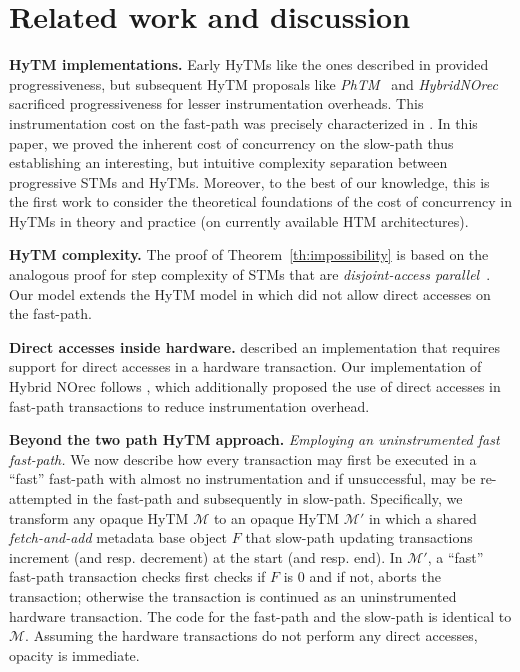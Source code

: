 \section{Related work and discussion}
\label{sec:rel}
%
\vspace{1mm}\noindent\textbf{HyTM implementations.}
Early HyTMs like the ones described in \cite{damronhytm, kumarhytm} provided progressiveness, but
subsequent HyTM proposals like \emph{PhTM}~\cite{phasedtm} and \emph{HybridNOrec}~\cite{hybridnorec} sacrificed progressiveness for lesser instrumentation overheads.
This instrumentation cost on the fast-path was precisely characterized in \cite{htmdisc15}.
In this paper, we proved the inherent cost of concurrency on the slow-path thus establishing an interesting, but intuitive complexity separation between progressive STMs and HyTMs.
Moreover, to the best of our knowledge, this is the first work to consider the theoretical foundations of the cost of concurrency in HyTMs in theory and practice (on currently available HTM architectures).

\vspace{1mm}\noindent\textbf{HyTM complexity.}
The proof of Theorem~\ref{th:impossibility} is based on the analogous proof for step complexity of STMs that are \emph{disjoint-access parallel}~\cite{prog15-pact}.
Our model extends the HyTM model in \cite{hytm14disc} which did not allow direct accesses on the fast-path.

\vspace{1mm}\noindent\textbf{Direct accesses inside hardware.}
\cite{kumarhytm} described an implementation that requires support for direct accesses in a hardware transaction. 
Our implementation of Hybrid NOrec follows \cite{hynorecriegel}, which additionally proposed the use of direct accesses
in fast-path transactions to reduce instrumentation overhead. %

\vspace{1mm}\noindent\textbf{Beyond the two path HyTM approach.}
\vspace{1mm}\noindent\textit{Employing an uninstrumented fast fast-path.}
We now describe how every transaction may first be executed in a ``fast'' fast-path with almost no instrumentation
and if unsuccessful, may be re-attempted in the fast-path and subsequently in slow-path.
Specifically, we transform any opaque HyTM $\mathcal{M}$ to an opaque
HyTM $\mathcal{M}'$ in which a shared \emph{fetch-and-add} metadata base object $F$ that slow-path updating transactions
increment (and resp. decrement) at the start (and resp. end). In $\mathcal{M}'$, a ``fast'' fast-path transaction checks first checks if $F$ is $0$
and if not, aborts the transaction; otherwise the transaction is continued as an uninstrumented hardware transaction.
The code for the fast-path and the slow-path is identical to $\mathcal{M}$.
Assuming the hardware transactions do not perform any direct accesses, opacity is immediate.

